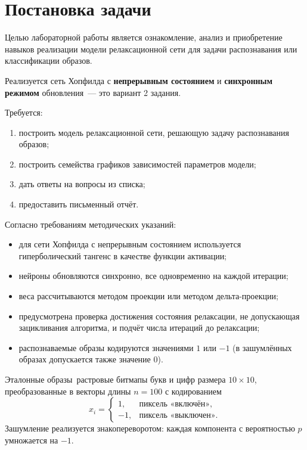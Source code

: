 \section{Постановка задачи}
\label{sec:task}

Целью лабораторной работы является ознакомление, анализ и приобретение навыков реализации модели релаксационной сети для задачи распознавания или классификации образов.

Реализуется сеть Хопфилда с \textbf{непрерывным состоянием} и \textbf{синхронным режимом} обновления~--- это вариант 2 задания.

Требуется:
\begin{enumerate}
	\item построить модель релаксационной сети, решающую задачу распознавания образов;
	\item построить семейства графиков зависимостей параметров модели;
	\item дать ответы на вопросы из списка;
	\item предоставить письменный отчёт.
\end{enumerate}

Согласно требованиям методических указаний:
\begin{itemize}
	\item для сети Хопфилда с непрерывным состоянием используется гиперболический тангенс в качестве функции активации;
	\item нейроны обновляются синхронно, все одновременно на каждой итерации;
	\item веса рассчитываются методом проекции или методом дельта-проекции;
	\item предусмотрена проверка достижения состояния релаксации, не допускающая зацикливания алгоритма, и подчёт числа итераций до релаксации;
	\item распознаваемые образы кодируются значениями $1$ или $-1$ (в зашумлённых образах допускается также значение $0$).
\end{itemize}

Эталонные образы~\mdash  растровые битмапы букв и цифр размера $10 \times 10$, преобразованные в векторы длины $n = 100$ с кодированием
\begin{equation}
	x_i =
	\begin{cases}
		1, & \text{пиксель «включён»}, \\
		-1, & \text{пиксель «выключен»}.
	\end{cases}
\end{equation}
Зашумление реализуется знакопереворотом: каждая компонента с вероятностью $p$ умножается на $-1$.
